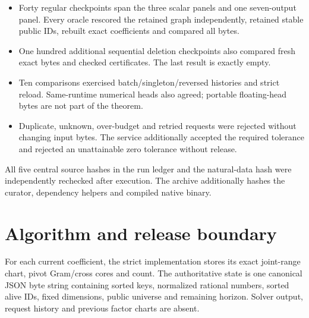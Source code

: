\documentclass[11pt,a4paper]{article}
\begin{document}
\begin{itemize}
\item Forty regular checkpoints span the three scalar panels and one
seven-output panel. Every oracle rescored the retained graph independently,
retained stable public IDs, rebuilt exact coefficients and compared all bytes.
\item One hundred additional sequential deletion checkpoints also compared
fresh exact bytes and checked certificates. The last result is exactly empty.
\item Ten comparisons exercised batch/singleton/reversed histories and strict
reload. Same-runtime numerical heads also agreed; portable floating-head
bytes are not part of the theorem.
\item Duplicate, unknown, over-budget and retried requests were rejected
without changing input bytes. The service additionally accepted the required
tolerance and rejected an unattainable zero tolerance without release.
\end{itemize}
All five central source hashes in the run ledger and the natural-data hash
were independently rechecked after execution. The archive additionally hashes
the curator, dependency helpers and compiled native binary.
\newpage

\section*{Algorithm and release boundary}
For each current coefficient, the strict implementation stores its exact
joint-range chart, pivot Gram/cross cores and count. The authoritative state
is one canonical JSON byte string containing sorted keys, normalized rational
numbers, sorted alive IDs, fixed dimensions, public universe and remaining
horizon. Solver output, request history and previous factor charts are absent.
\end{document}
